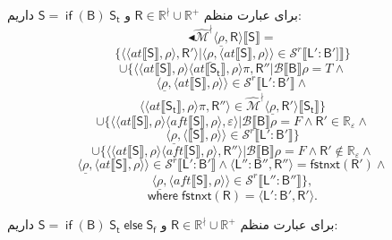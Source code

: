 برای عبارت منظم 
$\mathsf{R} \in \mathbb{R}^\nmid \cup \mathbb{R^+}$
و 
$\mathsf{S= \; if \; (B) \; S_t}$
داریم:
$$\blacktriangleleft\mathcal{\hat{M}^\nmid} \langle \underline{\rho},\mathsf{R} \rangle \llbracket \mathsf{S} \rrbracket=$$
$$\{\langle \langle at \llbracket \mathsf{S} \rrbracket , \rho \rangle , \mathsf{R'} \rangle | \langle \underline{\rho} , \langle at \llbracket \mathsf{S} \rrbracket , \rho \rangle \rangle \in \mathcal{S}^r \llbracket \mathsf{L':B'} ]\rrbracket \}$$
$$\cup \{\langle \langle at \llbracket \mathsf{S} \rrbracket , \rho \rangle \langle at \llbracket \mathsf{S_t} \rrbracket, \rho \rangle \pi, \mathsf{R''} | \mathcal{B}\llbracket\mathsf{B} \rrbracket \rho = \mathit{T} \land$$
$$\langle \underline{\rho},\langle at \llbracket \mathsf{S} \rrbracket , \rho \rangle \rangle \in \mathcal{S}^r \llbracket \mathsf{L':B'} \rrbracket \land$$
$$\langle \langle at \llbracket \mathsf{S_t} \rrbracket , \rho \rangle \pi,\mathsf{R''} \rangle \in \mathcal{\hat{M}^\nmid} \langle \underline{\rho}, \mathsf{R'} \rangle\llbracket \mathsf{S_t} \rrbracket \}$$
$$\cup \{\langle \langle at \llbracket \mathsf{S} \rrbracket, \rho \rangle \langle aft \llbracket \mathsf{S} \rrbracket , \rho \rangle , \varepsilon \rangle | \mathcal{B}\llbracket \mathsf{B} \rrbracket \rho = \mathit{F} \land \mathsf{R'} \in \mathbb{R_\varepsilon} \land$$
$$\langle \underline{\rho} , \langle \llbracket \mathsf{S} \rrbracket , \rho \rangle \rangle \in \mathcal{S}^r \llbracket \mathsf{L':B'} \rrbracket\}$$
$$\cup \{\langle \langle at \llbracket \mathsf{S} \rrbracket , \rho \rangle \langle aft \llbracket \mathsf{S} \rrbracket , \rho \rangle , \mathsf{R''} \rangle | \mathcal{B} \llbracket \mathsf{B} \rrbracket \rho = \mathit{F} \land \mathsf{R'} \notin \mathbb{R_\varepsilon} \land$$
$$\langle \underline{\rho}, \langle at \llbracket \mathsf{S} \rrbracket , \rho \rangle \rangle \in \mathcal{S}^r\llbracket \mathsf{L':B'} \rrbracket \land \langle \mathsf{L'':B''} , \mathsf{R''} \rangle = \mathsf{fstnxt(R')} \land$$
$$\langle \underline{\rho}, \langle aft \llbracket \mathsf{S} \rrbracket , \rho \rangle \rangle \in \mathcal{S}^r \llbracket \mathsf{L'':B''} \rrbracket \},$$
$$\mathsf{where\; fstnxt(R)=\langle L':B', R' \rangle}.$$


برای عبارت منظم 
$\mathsf{R} \in \mathbb{R}^\nmid \cup \mathbb{R^+}$
و 
$\mathsf{S= \; if \; (B) \; S_t \; else \; S_f}$
داریم:

